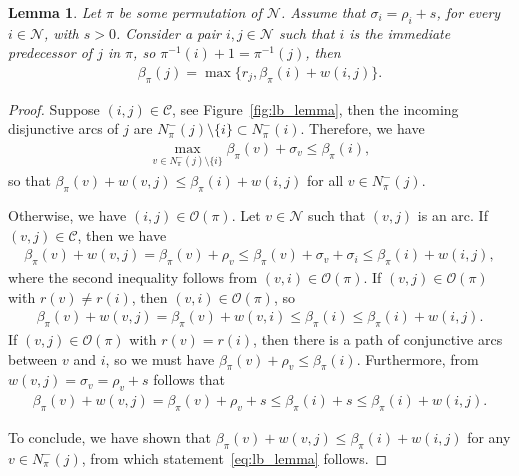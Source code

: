\documentclass[a4paper]{article}
\theoremstyle{definition}
\theoremstyle{plain}
\newtheorem{lemma}{Lemma}
\begin{document}
\begin{lemma}\label{lb_lemma}
  Let $\pi$ be some permutation of $\mathcal{N}$. Assume that
  $\sigma_{i} = \rho_{i} + s$, for every $i \in \mathcal{N}$, with $s > 0$.
  Consider a pair $i,j \in \mathcal{N}$ such that $i$ is the immediate predecessor
  of $j$ in $\pi$, so $\pi^{-1}(i) + 1 = \pi^{-1}(j)$, then
\begin{align}
  \label{eq:lb_lemma}
  \beta_\pi(j) = \max \{ r_{j}, \beta_\pi(i) + w(i, j) \} .
\end{align}
\end{lemma}
\begin{proof}
  Suppose $(i,j) \in \mathcal{C}$, see Figure~\ref{fig:lb_lemma},
  then the incoming disjunctive arcs of $j$ are
  $N^{-}_{\pi}(j) \setminus \{ i \} \subset N^{-}_{\pi}(i)$. Therefore, we have
  \begin{align*}
    \max_{v \in N^{-}_{\pi}(j) \setminus \{i\}} \beta_\pi(v) + \sigma_{v} \leq \beta_\pi(i) ,
  \end{align*}
  so that
      $\beta_\pi(v) + w(v,j) \leq \beta_\pi(i) + w(i,j)$
  for all $v \in N_{\pi}^{-}(j)$.

  Otherwise, we have $(i, j) \in \mathcal{O}(\pi)$.
  Let $v \in \mathcal{N}$ such that $(v, j)$ is an arc.
  If $(v,j) \in \mathcal{C}$, then we have
  \begin{align*}
    \beta_\pi(v) + w(v,j) =
    \beta_\pi(v) + \rho_{v} \leq \beta_\pi(v) + \sigma_{v} + \sigma_{i} \leq \beta_\pi(i) + w(i,j) ,
  \end{align*}
  where the second inequality follows from $(v,i) \in \mathcal{O}(\pi)$.
  If $(v, j) \in \mathcal{O}(\pi)$ with $r(v) \neq r(i)$, then $(v,i) \in \mathcal{O}(\pi)$, so
  \begin{align*}
    \beta_\pi(v) + w(v, j) = \beta_\pi(v) + w(v, i) \leq \beta_\pi(i) \leq \beta_\pi(i) + w(i,j) .
  \end{align*}
  If $(v, j) \in \mathcal{O}(\pi)$ with $r(v) = r(i)$, then there is a path of conjunctive arcs between $v$ and
  $i$, so we must have $\beta_\pi(v) + \rho_{v} \leq \beta_\pi(i)$.
  Furthermore, from $w(v,j) = \sigma_{v} = \rho_{v} + s$ follows that
  \begin{align*}
    \beta_\pi(v) + w(v,j) = \beta_\pi(v) + \rho_{v} + s \leq \beta_\pi(i) + s \leq \beta_\pi(i) + w(i, j) .
  \end{align*}

  To conclude, we have shown that
  $\beta_\pi(v) + w(v,j) \leq \beta_\pi(i) + w(i,j)$ for any
  $v \in N^{-}_{\pi}(j)$, from which statement~\eqref{eq:lb_lemma} follows.
\end{proof}
\end{document}
